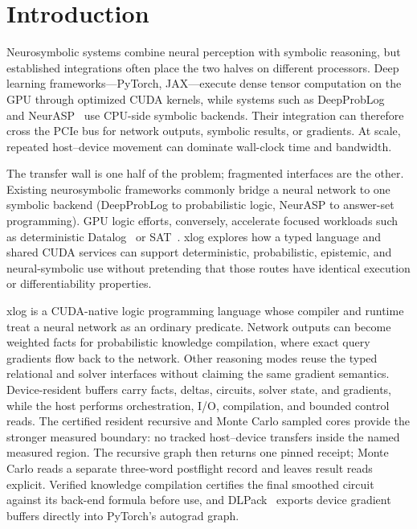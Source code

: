 \section{Introduction}\label{sec:intro}

Neurosymbolic systems combine neural perception with symbolic reasoning, but established integrations often place the two halves on different processors. Deep learning frameworks---PyTorch, JAX---execute dense tensor computation on the GPU through optimized CUDA kernels, while systems such as DeepProbLog~\cite{deepproblog} and NeurASP~\cite{neurasp} use CPU-side symbolic backends. Their integration can therefore cross the PCIe bus for network outputs, symbolic results, or gradients. At scale, repeated host--device movement can dominate wall-clock time and bandwidth.

The transfer wall is one half of the problem; fragmented interfaces are the other. Existing neurosymbolic frameworks commonly bridge a neural network to one symbolic backend (DeepProbLog to probabilistic logic, NeurASP to answer-set programming). GPU logic efforts, conversely, accelerate focused workloads such as deterministic Datalog~\cite{gpulog,vflog} or SAT~\cite{parafrost}. xlog explores how a typed language and shared CUDA services can support deterministic, probabilistic, epistemic, and neural-symbolic use without pretending that those routes have identical execution or differentiability properties.

xlog is a CUDA-native logic programming language whose compiler and runtime treat a neural network as an ordinary predicate. Network outputs can become weighted facts for probabilistic knowledge compilation, where exact query gradients flow back to the network. Other reasoning modes reuse the typed relational and solver interfaces without claiming the same gradient semantics. Device-resident buffers carry facts, deltas, circuits, solver state, and gradients, while the host performs orchestration, I/O, compilation, and bounded control reads. The certified resident recursive and Monte Carlo sampled cores provide the stronger measured boundary: no tracked host--device transfers inside the named measured region. The recursive graph then returns one pinned receipt; Monte Carlo reads a separate three-word postflight record and leaves result reads explicit. Verified knowledge compilation certifies the final smoothed circuit against its back-end formula before use, and DLPack~\cite{dlpack} exports device gradient buffers directly into PyTorch's autograd graph.

